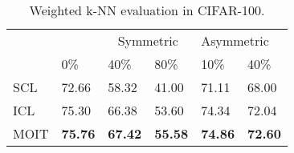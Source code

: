 \documentclass[final]{cvpr}
\begin{document}
\begin{table}[!t]
\centering{}\caption{\label{tab:Weighted-k-NN-evaluation}Weighted k-NN evaluation in CIFAR-100.}
\smallskip{}
\setlength{\tabcolsep}{4pt}{\small{}}\begin{tabularx}{\columnwidth}{Xlllll}
\toprule
 &  & \multicolumn{2}{c}{{\small{}Symmetric}} & \multicolumn{2}{l}{{\small{}Asymmetric}}\tabularnewline
 & {\small{}0\%} & {\small{}40\%} & {\small{}80\%} & {\small{}10\%} & {\small{}40\%}\tabularnewline
\midrule
{\small{}SCL} & {\small{}72.66} & {\small{}58.32} & {\small{}41.00} & {\small{}71.11} & {\small{}68.00}\tabularnewline

{\small{}ICL} & {\small{}75.30} & {\small{}66.38} & {\small{}53.60} & {\small{}74.34} & {\small{}72.04}\tabularnewline
 
{\small{}MOIT} & \textbf{\small{}75.76} & \textbf{\small{}67.42} & \textbf{\small{}55.58} & \textbf{\small{}74.86} & \textbf{\small{}72.60}\tabularnewline
\bottomrule
\end{tabularx}
\end{table}
\end{document}
